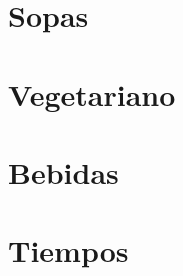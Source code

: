 \documentclass[twoside,12pt]{article}
\begin{document}
\section{Sopas}




\section{Vegetariano}


\section{Bebidas}


\section{Tiempos}

\end{document}
